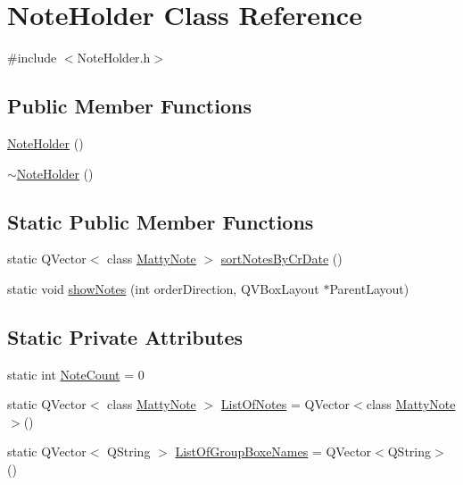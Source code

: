 \hypertarget{classNoteHolder}{}\section{Note\+Holder Class Reference}
\label{classNoteHolder}


{\ttfamily \#include $<$Note\+Holder.\+h$>$}

\subsection*{Public Member Functions}
\begin{DoxyCompactItemize}
\item 
\hyperlink{classNoteHolder_a8a6d0e272ccfe8f56534c646b8c5e92c}{Note\+Holder} ()
\item 
\hyperlink{classNoteHolder_afaeb3c127fbbc30d03b69e2cb0f15f2a}{$\sim$\+Note\+Holder} ()
\end{DoxyCompactItemize}
\subsection*{Static Public Member Functions}
\begin{DoxyCompactItemize}
\item 
static Q\+Vector$<$ class \hyperlink{classMattyNote}{Matty\+Note} $>$ \hyperlink{classNoteHolder_ab52d375cf5ab24f0512fab6308ec8b25}{sort\+Notes\+By\+Cr\+Date} ()
\item 
static void \hyperlink{classNoteHolder_a9fbdbdf5cc2628f360c45eb861eacded}{show\+Notes} (int order\+Direction, Q\+V\+Box\+Layout $\ast$Parent\+Layout)
\end{DoxyCompactItemize}
\subsection*{Static Private Attributes}
\begin{DoxyCompactItemize}
\item 
static int \hyperlink{classNoteHolder_a7fd3dd17b879e12cef0b0466ef04ed37}{Note\+Count} = 0
\item 
static Q\+Vector$<$ class \hyperlink{classMattyNote}{Matty\+Note} $>$ \hyperlink{classNoteHolder_a00b2d3ea1a95febaf0d8a5526b786e95}{List\+Of\+Notes} = Q\+Vector$<$class \hyperlink{classMattyNote}{Matty\+Note}$>$()
\item 
static Q\+Vector$<$ Q\+String $>$ \hyperlink{classNoteHolder_a9106819d414e3e131560ef3fcbea4d18}{List\+Of\+Group\+Boxe\+Names} = Q\+Vector$<$Q\+String$>$()
\end{DoxyCompactItemize}


